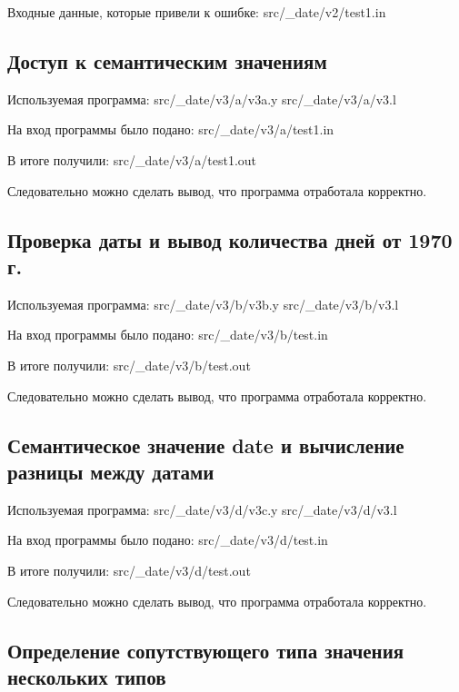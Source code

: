     Входные данные, которые привели к ошибке:
     {src/_date/v2/test1.in}


\subsection{Доступ к семантическим значениям}

    Используемая программа:
     {src/_date/v3/a/v3a.y}
     {src/_date/v3/a/v3.l}

    На вход программы было подано:
     {src/_date/v3/a/test1.in}

    В итоге получили:
     {src/_date/v3/a/test1.out}

    Следовательно можно сделать вывод, что программа отработала корректно.


\subsection{Проверка даты и вывод количества дней от 1970 г.}

    Используемая программа:
     {src/_date/v3/b/v3b.y}
     {src/_date/v3/b/v3.l}

    На вход программы было подано:
     {src/_date/v3/b/test.in}

    В итоге получили:
     {src/_date/v3/b/test.out}

    Следовательно можно сделать вывод, что программа отработала корректно.


\subsection{Семантическое значение date и вычисление разницы между датами}

    Используемая программа:
     {src/_date/v3/d/v3c.y}
     {src/_date/v3/d/v3.l}

    На вход программы было подано:
     {src/_date/v3/d/test.in}

    В итоге получили:
     {src/_date/v3/d/test.out}

    Следовательно можно сделать вывод, что программа отработала корректно.

\subsection{Определение сопутствующего типа значения нескольких типов}

